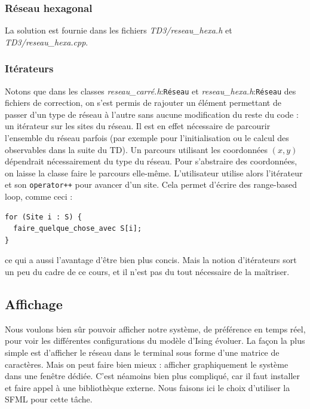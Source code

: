 \documentclass{book}
\newcommand{\inline}[1]{\texttt{#1}}
\def\filename{\emph}
\begin{document}
\begin{correction}
\subsubsection*{Réseau hexagonal}

La solution est fournie dans les fichiers \filename{TD3/reseau\_hexa.h} et \filename{TD3/reseau\_hexa.cpp}.

\subsubsection*{Itérateurs}

Notons que dans les classes \filename{reseau\_carré.h}:\inline{Réseau} et \filename{reseau\_hexa.h}:\inline{Réseau} des fichiers de correction, on s'est permis de rajouter un élément permettant de passer d'un type de réseau à l'autre sans aucune modification du reste du code : un itérateur sur les sites du réseau. Il est en effet nécessaire de parcourir l'ensemble du réseau parfois (par exemple pour l'initialisation ou le calcul des observables dans la suite du TD). Un parcours utilisant les coordonnées $(x,y)$ dépendrait nécessairement du type du réseau. Pour s'abstraire des coordonnées, on laisse la classe faire le parcours elle-même. L'utilisateur utilise alors l'itérateur et son \inline{operator++} pour avancer d'un site. Cela permet d'écrire des range-based loop, comme ceci :
\begin{verbatim}
for (Site i : S) {
  faire_quelque_chose_avec S[i];
}
\end{verbatim}
ce qui a aussi l'avantage d'être bien plus concis. Mais la notion d'itérateurs sort un peu du cadre de ce cours, et il n'est pas du tout nécessaire de la maîtriser.

\end{correction}

\subsection{Affichage}

Nous voulons bien sûr pouvoir afficher notre système, de préférence en temps réel, pour voir les différentes configurations du modèle d'Ising évoluer. La façon la plus simple est d'afficher le réseau dans le terminal sous forme d'une matrice de caractères. Mais on peut faire bien mieux : afficher graphiquement le système dans une fenêtre dédiée. C'est néamoins bien plus compliqué, car il faut installer et faire appel à une bibliothèque externe. Nous faisons ici le choix d'utiliser la SFML pour cette tâche.
\end{document}
